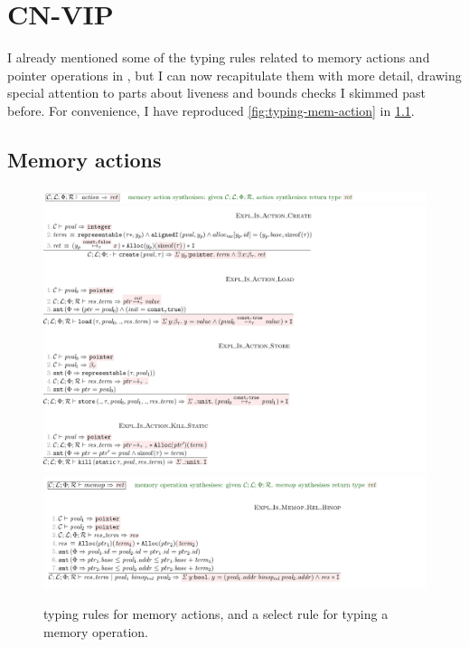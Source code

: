 \chapter{CN-VIP}\label{chap:cn-vip}

\margintoc{}

I already mentioned some of the typing rules related to memory actions and
pointer operations in , but I can now
recapitulate them with more detail, drawing special attention to parts about
liveness and bounds checks I skimmed past before. For convenience, I have
reproduced \cref{fig:typing-mem-action} in \cref{fig:cnvip-mem-action}.

\section{Memory actions}

\begin{figure}[tp]
    \includegraphics{figures/kernel-mem-action-typing-1}
    \includegraphics{figures/kernel-mem-action-typing-2}
    \includegraphics{figures/kernel-memop-typing}
    \caption{ typing rules for memory actions, and a select rule
        for typing a memory operation.}\label{fig:cnvip-mem-action}
\end{figure}

